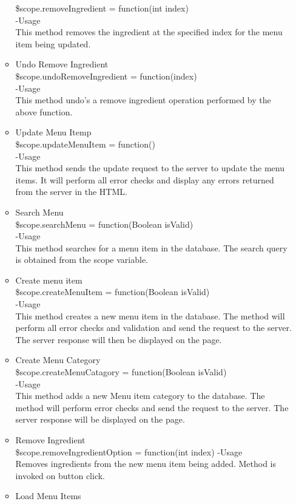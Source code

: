 \documentclass[a4paper,12pt]{article}
\begin{document}
\begin{enumerate}
\begin{itemize}
		\$scope.removeIngredient = function(int index)\\
		-Usage\\
		This method removes the ingredient at the specified index for the menu item being updated.
		\item Undo Remove Ingredient\\
		\$scope.undoRemoveIngredient = function(index)\\
		-Usage\\
		This method undo's a remove ingredient operation performed by the above function.
		\item Update Menu Itemp\\
		\$scope.updateMenuItem = function()\\
		-Usage\\
		This method sends the update request to the server to update the menu items. It will perform all error checks and display any errors returned from the server in the HTML.
		\item Search Menu\\
		\$scope.searchMenu = function(Boolean isValid)\\
		-Usage\\
		This method searches for a menu item in the database. The search query is obtained from the scope variable.
		\item Create menu item\\
		\$scope.createMenuItem = function(Boolean isValid)\\
		-Usage\\
		This method creates a new menu item in the database. The method will perform all error checks and validation and send the request to the server. The server response will then be displayed on the page.
		\item Create Menu Category\\
		\$scope.createMenuCatagory = function(Boolean isValid)\\
		-Usage\\
		This method adds a new Menu item category to the database. The method will perform error checks and send the request to the server. The server response will be displayed on the page.
		\item Remove Ingredient\\
		\$scope.removeIngredientOption = function(int index)
		-Usage\\
		Removes ingredients from the  new menu item being added. Method is invoked on button click.
		\item Load Menu Items\\

\end{itemize}
\end{enumerate}
\end{document}
